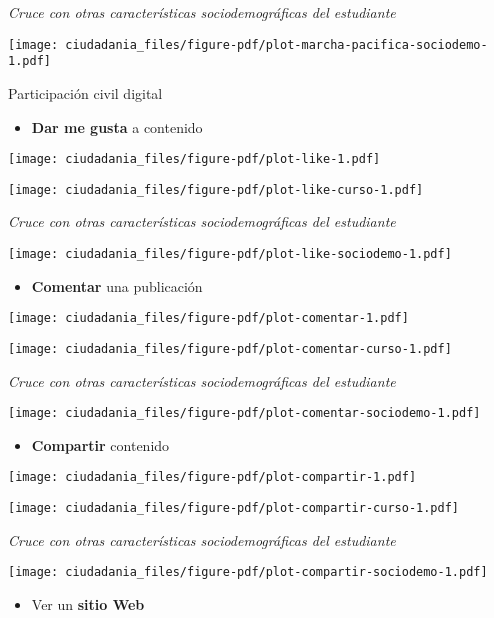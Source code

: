 \documentclass[
  letterpaper,
  DIV=11,
  numbers=noendperiod]{scrreprt}
\providecommand{\tightlist}{%
  \setlength{\itemsep}{0pt}\setlength{\parskip}{0pt}}\usepackage{longtable,booktabs,array}
\begin{document}
\emph{Cruce con otras características sociodemográficas del estudiante}

\texttt{[image: ciudadania\_files/figure-pdf/plot-marcha-pacifica-sociodemo-1.pdf]}

Participación civil digital

\begin{itemize}
\tightlist
\item
  \textbf{Dar me gusta} a contenido
\end{itemize}

\texttt{[image: ciudadania\_files/figure-pdf/plot-like-1.pdf]}

\texttt{[image: ciudadania\_files/figure-pdf/plot-like-curso-1.pdf]}

\emph{Cruce con otras características sociodemográficas del estudiante}

\texttt{[image: ciudadania\_files/figure-pdf/plot-like-sociodemo-1.pdf]}

\begin{itemize}
\tightlist
\item
  \textbf{Comentar} una publicación
\end{itemize}

\texttt{[image: ciudadania\_files/figure-pdf/plot-comentar-1.pdf]}

\texttt{[image: ciudadania\_files/figure-pdf/plot-comentar-curso-1.pdf]}

\emph{Cruce con otras características sociodemográficas del estudiante}

\texttt{[image: ciudadania\_files/figure-pdf/plot-comentar-sociodemo-1.pdf]}

\begin{itemize}
\tightlist
\item
  \textbf{Compartir} contenido
\end{itemize}

\texttt{[image: ciudadania\_files/figure-pdf/plot-compartir-1.pdf]}

\texttt{[image: ciudadania\_files/figure-pdf/plot-compartir-curso-1.pdf]}

\emph{Cruce con otras características sociodemográficas del estudiante}

\texttt{[image: ciudadania\_files/figure-pdf/plot-compartir-sociodemo-1.pdf]}

\begin{itemize}
\tightlist
\item
  Ver un \textbf{sitio Web}
\end{itemize}
\end{document}
